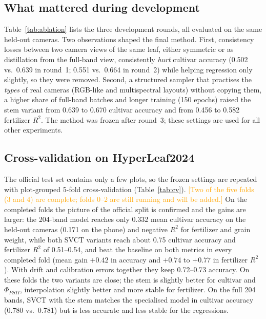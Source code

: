 \documentclass[preprint,12pt,authoryear]{elsarticle}
\newcommand{\todo}[1]{\textcolor{orange}{[#1]}}
\begin{document}
\subsection{What mattered during development}
\label{sec:ablation}
Table~\ref{tab:ablation} lists the three development rounds, all evaluated on the same held-out cameras. Two
observations shaped the final method. First, consistency losses between two camera views of the same leaf, either
symmetric or as distillation from the full-band view, consistently \emph{hurt} cultivar accuracy (0.502 vs.\ 0.639 in
round~1; 0.551 vs.\ 0.664 in round~2) while helping regression only slightly, so they were removed. Second, a structured
sampler that practises the \emph{types} of real cameras (RGB-like and multispectral layouts) without copying them, a
higher share of full-band batches and longer training (150 epochs) raised the stem variant from 0.639 to 0.670 cultivar
accuracy and from 0.456 to 0.582 fertilizer $R^2$. The method was frozen after round~3; these settings are used for all
other experiments.

\begin{table}[t]
\centering\scriptsize
\setlength{\tabcolsep}{3pt}
\caption{Development rounds (official split; mean over the seven held-out cameras, ideal conditions).}
\label{tab:ablation}

\end{table}

\subsection{Cross-validation on HyperLeaf2024}
\label{sec:cv}
The official test set contains only a few plots, so the frozen settings are repeated with plot-grouped 5-fold
cross-validation (Table~\ref{tab:cv}). \todo{Two of the five folds (3 and 4) are complete; folds 0--2 are still running and
will be added.} On the completed folds the picture of the official split is confirmed and the gains are larger: the
204-band model reaches only 0.332 mean cultivar accuracy on the held-out cameras (0.171 on the phone) and negative $R^2$
for fertilizer and grain weight, while both SVCT variants reach about 0.75 cultivar accuracy and fertilizer $R^2$ of
0.51--0.54, and beat the baseline on both metrics in every completed fold (mean gain $+0.42$ in accuracy and $+0.74$ to
$+0.77$ in fertilizer $R^2$). With drift and calibration errors together they keep 0.72--0.73 accuracy. On these folds
the two variants are close; the stem is slightly better for cultivar and $\Phi_{PSII}$, interpolation slightly better and
more stable for fertilizer. On the full 204 bands, SVCT with the stem matches the specialised model in cultivar accuracy
(0.780 vs.\ 0.781) but is less accurate and less stable for the regressions.
\end{document}

